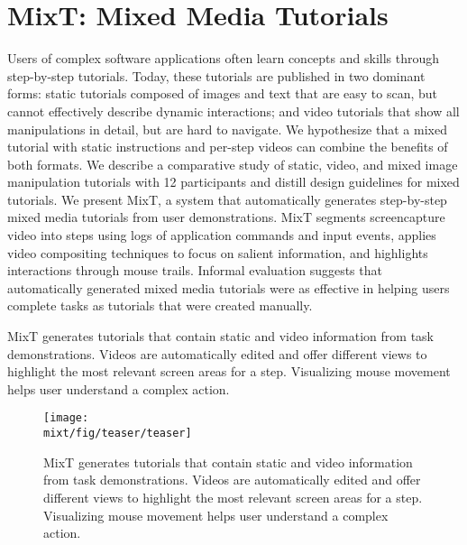 \chapter{MixT: Mixed Media Tutorials}
\label{chapter_mixt}

Users of complex software applications often learn concepts and skills through step-by-step tutorials. Today, these tutorials are published in two dominant forms: static tutorials composed of images and text that are easy to scan, but cannot effectively describe dynamic interactions; and video tutorials that show all manipulations in detail, but are hard to navigate. We hypothesize that a mixed tutorial with static instructions and per-step videos can combine the benefits of both formats. We describe a comparative study of static, video, and mixed image manipulation tutorials with 12 participants and distill design guidelines for mixed tutorials. We present MixT, a system that automatically generates step-by-step mixed media tutorials from user demonstrations. MixT segments screencapture video into steps using logs of application commands and input events, applies video compositing techniques to focus on salient information, and highlights interactions through mouse trails. Informal evaluation suggests that automatically generated mixed media tutorials were as effective in helping users complete tasks as tutorials that were created manually.

MixT generates tutorials that contain static and video information from task demonstrations. Videos are automatically edited and offer different views to highlight the most relevant screen areas for a step. Visualizing mouse movement helps user understand a complex action.

\begin{figure*}[t]
  \centering
  \texttt{[image: \\mixt/fig/teaser/teaser]}
  \caption{MixT generates tutorials that contain static and video information from task demonstrations. Videos are automatically edited and offer different views to highlight the most relevant screen areas for a step. Visualizing mouse movement helps user understand a complex action.}
  \label{fig:mixt_teaser}
\end{figure*}











